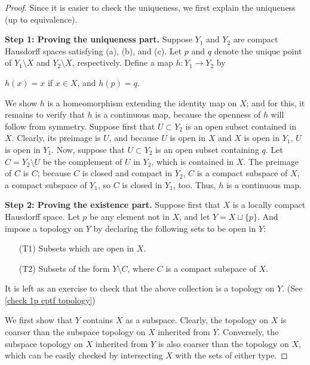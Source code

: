 \begin{proof}
    Since it is easier to check the uniqueness, we first explain the uniqueness (up to equivalence).

    \textbf{Step 1: Proving the uniqueness part.}\newline\noindent
    Suppose $Y_1$ and $Y_2$ are compact Hausdorff spaces satisfying (a), (b), and (c).
    Let $p$ and $q$ denote the unique point of $Y_1\setminus X$ and $Y_2\setminus X$, respectively.
    Define a map $h: Y_1\rightarrow Y_2$ by
    \begin{center}
        $h(x)=x$ if $x\in X$, and $h(p)=q$.
    \end{center}
    We show $h$ is a homeomorphism extending the identity map on $X$; and for this, it remains to verify that $h$ is a continuous map, because the openness of $h$ will follow from symmetry.
    Suppose first that $U\subset Y_2$ is an open subset contained in $X$.
    Clearly, its preimage is $U$, and because $U$ is open in $X$ and $X$ is open in $Y_1$, $U$ is open in $Y_1$.
    Now, suppose that $U\subset Y_2$ is an open subset containing $q$.
    Let $C=Y_2\setminus U$ be the complement of $U$ in $Y_2$, which is contained in $X$.
    The preimage of $C$ is $C$; because $C$ is closed and compact in $Y_2$, $C$ is a compact subspace of $X$, a compact subspace of $Y_1$, so $C$ is closed in $Y_1$, too.
    Thus, $h$ is a continuous map.

    \textbf{Step 2: Proving the existence part.}\newline\noindent
    Suppose first that $X$ is a locally compact Hausdorff space.
    Let $p$ be any element not in $X$, and let $Y=X\sqcup\{p\}$.
    And impose a topology on $Y$ by declaring the following sets to be open in $Y$:
    \begin{enumerate}
        \item[(T1)]
        {
            Subsets which are open in $X$.
        }
        \item[(T2)]
        {
            Subsets of the form $Y\setminus C$, where $C$ is a compact subspace of $X$.
        }
    \end{enumerate}
    It is left as an exercise to check that the above collection is a topology on $Y$. (See \cref{check 1p cptf topology})

    We first show that $Y$ contains $X$ as a subspace.
    Clearly, the topology on $X$ is coarser than the subspace topology on $X$ inherited from $Y$.
    Conversely, the subspace topology on $X$ inherited from $Y$ is also coarser than the topology on $X$, which can be easily checked by intersecting $X$ with the sets of either type.


\end{proof}
